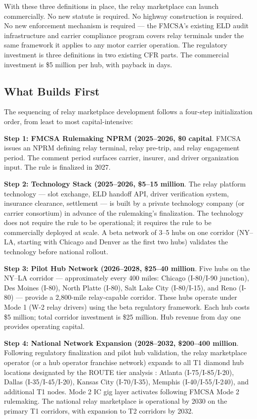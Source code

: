 With these three definitions in place, the relay marketplace can launch commercially. No new
statute is required. No highway construction is required. No new enforcement mechanism is
required --- the FMCSA's existing ELD audit infrastructure and carrier compliance program
covers relay terminals under the same framework it applies to any motor carrier operation.
The regulatory investment is three definitions in two existing CFR parts. The commercial
investment is \$5 million per hub, with payback in days.

\subsection{What Builds First}

The sequencing of relay marketplace development follows a four-step initialization order,
from least to most capital-intensive:

\textbf{Step 1: FMCSA Rulemaking NPRM (2025--2026, \$0 capital}.
FMCSA issues an NPRM defining relay terminal, relay pre-trip, and relay engagement period.
The comment period surfaces carrier, insurer, and driver organization input. The rule is
finalized in 2027.

\textbf{Step 2: Technology Stack (2025--2026, \$5--15 million}.
The relay platform technology --- slot exchange, ELD handoff API, driver verification system,
insurance clearance, settlement --- is built by a private technology company (or carrier
consortium) in advance of the rulemaking's finalization. The technology does not require the
rule to be operational; it requires the rule to be commercially deployed at scale. A beta
network of 3--5 hubs on one corridor (NY--LA, starting with Chicago and Denver as the first
two hubs) validates the technology before national rollout.

\textbf{Step 3: Pilot Hub Network (2026--2028, \$25--40 million}.
Five hubs on the NY--LA corridor --- approximately every 400 miles: Chicago (I-80/I-90 junction),
Des Moines (I-80), North Platte (I-80), Salt Lake City (I-80/I-15), and Reno (I-80) ---
provide a 2,800-mile relay-capable corridor. These hubs operate under Mode 1 (W-2 relay
drivers) using the beta regulatory framework. Each hub costs \$5 million; total corridor
investment is \$25 million. Hub revenue from day one provides operating capital.

\textbf{Step 4: National Network Expansion (2028--2032, \$200--400 million}.
Following regulatory finalization and pilot hub validation, the relay marketplace operator
(or a hub operator franchise network) expands to all T1 diamond hub locations designated by
the ROUTE tier analysis \citep{ROUTE_E1}: Atlanta (I-75/I-85/I-20), Dallas (I-35/I-45/I-20),
Kansas City (I-70/I-35), Memphis (I-40/I-55/I-240), and additional T1 nodes. Mode 2 IC gig
layer activates following FMCSA Mode 2 rulemaking. The national relay marketplace is
operational by 2030 on the primary T1 corridors, with expansion to T2 corridors by 2032.

